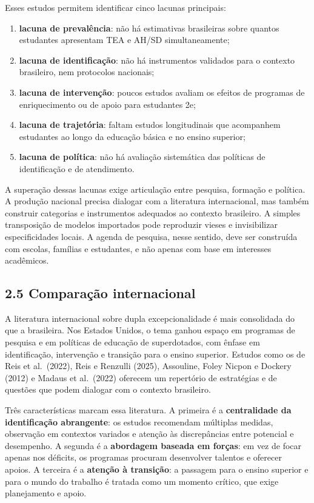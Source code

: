 Esses estudos permitem identificar cinco lacunas principais:

\begin{enumerate}
\def\labelenumi{\alph{enumi})}
\item
  \textbf{lacuna de prevalência}: não há estimativas brasileiras sobre
  quantos estudantes apresentam TEA e AH/SD simultaneamente;
\item
  \textbf{lacuna de identificação}: não há instrumentos validados para o
  contexto brasileiro, nem protocolos nacionais;
\item
  \textbf{lacuna de intervenção}: poucos estudos avaliam os efeitos de
  programas de enriquecimento ou de apoio para estudantes 2e;
\item
  \textbf{lacuna de trajetória}: faltam estudos longitudinais que
  acompanhem estudantes ao longo da educação básica e no ensino
  superior;
\item
  \textbf{lacuna de política}: não há avaliação sistemática das
  políticas de identificação e de atendimento.
\end{enumerate}

A superação dessas lacunas exige articulação entre pesquisa, formação e
política. A produção nacional precisa dialogar com a literatura
internacional, mas também construir categorias e instrumentos adequados
ao contexto brasileiro. A simples transposição de modelos importados
pode reproduzir vieses e invisibilizar especificidades locais. A agenda
de pesquisa, nesse sentido, deve ser construída com escolas, famílias e
estudantes, e não apenas com base em interesses acadêmicos.

\subsection{2.5 Comparação
internacional}\label{comparauxe7uxe3o-internacional}

A literatura internacional sobre dupla excepcionalidade é mais
consolidada do que a brasileira. Nos Estados Unidos, o tema ganhou
espaço em programas de pesquisa e em políticas de educação de
superdotados, com ênfase em identificação, intervenção e transição para
o ensino superior. Estudos como os de Reis et al.~(2022), Reis e
Renzulli (2025), Assouline, Foley Nicpon e Dockery (2012) e Madaus et
al.~(2022) oferecem um repertório de estratégias e de questões que podem
dialogar com o contexto brasileiro.

Três características marcam essa literatura. A primeira é a
\textbf{centralidade da identificação abrangente}: os estudos recomendam
múltiplas medidas, observação em contextos variados e atenção às
discrepâncias entre potencial e desempenho. A segunda é a
\textbf{abordagem baseada em forças}: em vez de focar apenas nos
déficits, os programas procuram desenvolver talentos e oferecer apoios.
A terceira é a \textbf{atenção à transição}: a passagem para o ensino
superior e para o mundo do trabalho é tratada como um momento crítico,
que exige planejamento e apoio.

